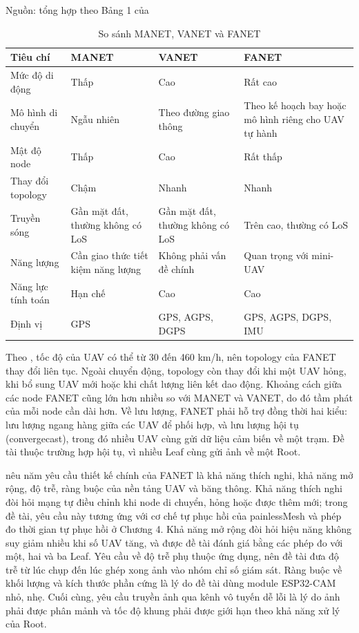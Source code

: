 \begin{table}[!htbp]
\centering
\caption{So sánh MANET, VANET và FANET}\label{tab:2.1}
{\fontsize{12}{14.5}\selectfont Nguồn: tổng hợp theo Bảng 1 của \citet{bekmezci2013}\par}
\vspace{4pt}
{\fontsize{12}{14.5}\selectfont\renewcommand{\arraystretch}{1.25}
\begin{tabular}{|L{3.00cm}|L{3.20cm}|L{3.20cm}|L{4.30cm}|}
\hline
\textbf{Tiêu chí} & \textbf{MANET} & \textbf{VANET} & \textbf{FANET} \\
\hline
Mức độ di động & Thấp & Cao & Rất cao \\
\hline
Mô hình di chuyển & Ngẫu nhiên & Theo đường giao thông & Theo kế hoạch bay hoặc mô hình riêng cho UAV tự hành \\
\hline
Mật độ node & Thấp & Cao & Rất thấp \\
\hline
Thay đổi topology & Chậm & Nhanh & Nhanh \\
\hline
Truyền sóng & Gần mặt đất, thường không có LoS & Gần mặt đất, thường không có LoS & Trên cao, thường có LoS \\
\hline
Năng lượng & Cần giao thức tiết kiệm năng lượng & Không phải vấn đề chính & Quan trọng với mini-UAV \\
\hline
Năng lực tính toán & Hạn chế & Cao & Cao \\
\hline
Định vị & GPS & GPS, AGPS, DGPS & GPS, AGPS, DGPS, IMU \\
\hline
\end{tabular}}
\end{table}

Theo \citet{bekmezci2013}, tốc độ của UAV có thể từ 30 đến 460 km/h, nên topology của FANET thay đổi liên tục. Ngoài chuyển động, topology còn thay đổi khi một UAV hỏng, khi bổ sung UAV mới hoặc khi chất lượng liên kết dao động. Khoảng cách giữa các node FANET cũng lớn hơn nhiều so với MANET và VANET, do đó tầm phát của mỗi node cần dài hơn. Về lưu lượng, FANET phải hỗ trợ đồng thời hai kiểu: lưu lượng ngang hàng giữa các UAV để phối hợp, và lưu lượng hội tụ (convergecast), trong đó nhiều UAV cùng gửi dữ liệu cảm biến về một trạm. Đề tài thuộc trường hợp hội tụ, vì nhiều Leaf cùng gửi ảnh về một Root.

\citet{bekmezci2013} nêu năm yêu cầu thiết kế chính của FANET là khả năng thích nghi, khả năng mở rộng, độ trễ, ràng buộc của nền tảng UAV và băng thông. Khả năng thích nghi đòi hỏi mạng tự điều chỉnh khi node di chuyển, hỏng hoặc được thêm mới; trong đề tài, yêu cầu này tương ứng với cơ chế tự phục hồi của painlessMesh và phép đo thời gian tự phục hồi ở Chương 4. Khả năng mở rộng đòi hỏi hiệu năng không suy giảm nhiều khi số UAV tăng, và được đề tài đánh giá bằng các phép đo với một, hai và ba Leaf. Yêu cầu về độ trễ phụ thuộc ứng dụng, nên đề tài đưa độ trễ từ lúc chụp đến lúc ghép xong ảnh vào nhóm chỉ số giám sát. Ràng buộc về khối lượng và kích thước phần cứng là lý do đề tài dùng module ESP32-CAM nhỏ, nhẹ. Cuối cùng, yêu cầu truyền ảnh qua kênh vô tuyến dễ lỗi là lý do ảnh phải được phân mảnh và tốc độ khung phải được giới hạn theo khả năng xử lý của Root.

